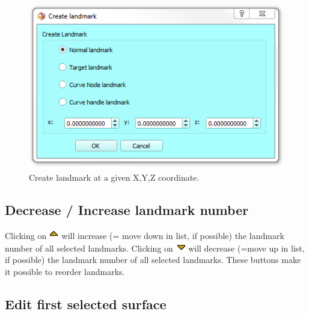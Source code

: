 \begin{figure}
  \centering
  \includegraphics[scale=0.55]{images/06/objects/create_landmark.png} 
	\caption{Create landmark at a given X,Y,Z coordinate.}
\label{create_landmark}
 
\end{figure}
\subsection{Decrease / Increase landmark number}
Clicking on \includegraphics[scale=0.7]{images/06/objects/move_up.png} will increase (= move down in list, if possible) the landmark number of all selected landmarks. Clicking on \includegraphics[scale=0.7]{images/06/objects/move_down.png} will decrease (=move up in list, if possible) the landmark number of all selected landmarks. These buttons make it possible to reorder landmarks.
\subsection{Edit first selected surface}

